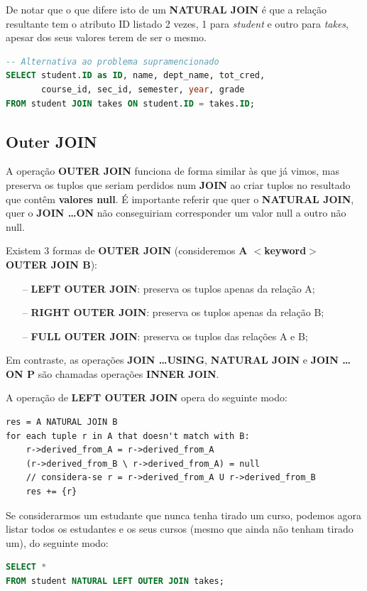 \documentclass[oneside]{book}
\theoremstyle{definition}
\begin{document}
De notar que o que difere isto de um \textbf{NATURAL JOIN} é que a relação resultante tem o atributo ID listado 2 vezes, 1 para \textit{student} e outro para \textit{takes}, apesar dos seus valores terem de ser o mesmo.
\begin{lstlisting}[language=SQL, morekeywords={REFERENCES, REFRESH, MATERIALIZED, CONCURRENTLY}, framesep=8pt, xleftmargin=40pt, framexleftmargin=40pt, frame=tb, framerule=0pt]
-- Alternativa ao problema supramencionado
SELECT student.ID as ID, name, dept_name, tot_cred, 
       course_id, sec_id, semester, year, grade
FROM student JOIN takes ON student.ID = takes.ID;
\end{lstlisting}

\subsection{Outer JOIN}
A operação \textbf{OUTER JOIN} funciona de forma similar às que já vimos, mas preserva os tuplos que seriam perdidos num \textbf{JOIN} ao criar tuplos no resultado que contêm \textbf{valores null}. É importante referir que quer o \textbf{NATURAL JOIN}, quer o \textbf{JOIN \dots ON} não conseguiriam corresponder um valor null a outro não null.

Existem 3 formas de \textbf{OUTER JOIN} (consideremos \textbf{A $<$keyword$>$ OUTER JOIN B}):
\begin{itemize}
    \itemsep0cm
    \item[--]\textbf{LEFT OUTER JOIN}: preserva os tuplos apenas da relação A;
    \item[--]\textbf{RIGHT OUTER JOIN}: preserva os tuplos apenas da relação B;
    \item[--]\textbf{FULL OUTER JOIN}: preserva os tuplos das relações A e B;
\end{itemize}

Em contraste, as operações \textbf{JOIN \dots USING}, \textbf{NATURAL JOIN} e \textbf{JOIN \dots ON P} são chamadas operações \textbf{INNER JOIN}.

A operação de \textbf{LEFT OUTER JOIN} opera do seguinte modo:
\begin{verbatim}
res = A NATURAL JOIN B
for each tuple r in A that doesn't match with B:
    r->derived_from_A = r->derived_from_A
    (r->derived_from_B \ r->derived_from_A) = null
    // considera-se r = r->derived_from_A U r->derived_from_B
    res += {r}
\end{verbatim}

Se considerarmos um estudante que nunca tenha tirado um curso, podemos agora listar todos os estudantes e os seus cursos (mesmo que ainda não tenham tirado um), do seguinte modo:
\begin{lstlisting}[language=SQL, morekeywords={REFERENCES, REFRESH, MATERIALIZED, CONCURRENTLY}, framesep=8pt, xleftmargin=40pt, framexleftmargin=40pt, frame=tb, framerule=0pt]
SELECT *
FROM student NATURAL LEFT OUTER JOIN takes;
\end{lstlisting}
\end{document}
